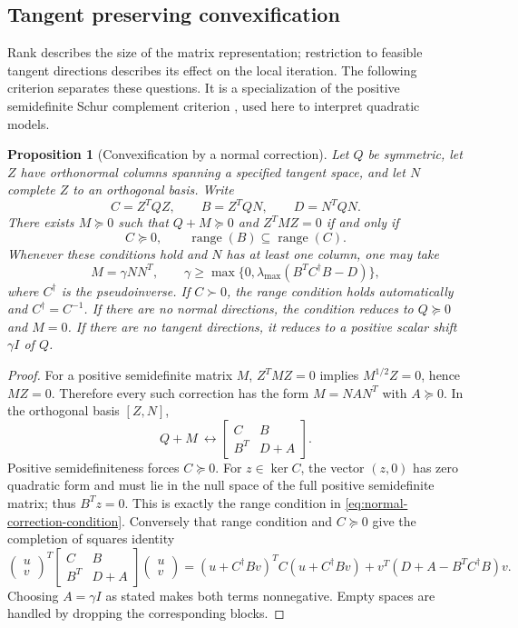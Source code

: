 \documentclass[pdflatex,sn-mathphys-num]{sn-jnl}
\theoremstyle{thmstyleone}
\newtheorem{proposition}[theorem]{Proposition}
\theoremstyle{thmstylethree}
\begin{document}
\subsection{Tangent preserving convexification}
\label{sec:normal-correction}
Rank describes the size of the matrix representation; restriction to
feasible tangent directions describes its effect on the local iteration.
The following criterion separates these questions. It is a specialization of the positive semidefinite
Schur complement criterion \citep{HornJohnson2013}, used here to interpret quadratic models.

\begin{proposition}[Convexification by a normal correction]
\label{prop:normal-correction}
Let $Q$ be symmetric, let $Z$ have orthonormal columns spanning a
specified tangent space, and let $N$ complete $Z$ to an orthogonal
basis. Write
\[
 C=Z^TQZ,\qquad B=Z^TQN,\qquad D=N^TQN.
\]
There exists $M\succeq0$ such that
$Q+M\succeq0$ and $Z^TMZ=0$ if and only if
\begin{equation}\label{eq:normal-correction-condition}
 C\succeq0,\qquad \operatorname{range}(B)
                         \subseteq\operatorname{range}(C).
\end{equation}
Whenever these conditions hold and $N$ has at least one column, one may take
\[
 M=\gamma NN^T,\qquad
 \gamma\geq\max\{0,\lambda_{\max}(B^TC^\dagger B-D)\},
\]
where $C^\dagger$ is the pseudoinverse. If $C\succ0$,
the range condition holds automatically and $C^\dagger=C^{-1}$.
If there are no normal directions, the condition reduces to
$Q\succeq0$ and $M=0$. If there are no tangent directions, it
reduces to a positive scalar shift $\gamma I$ of $Q$.
\end{proposition}
\begin{proof}
For a positive semidefinite matrix $M$, $Z^TMZ=0$ implies
$M^{1/2}Z=0$, hence $MZ=0$. Therefore every such correction has the
form $M=NAN^T$ with $A\succeq0$. In the orthogonal basis $[Z,N]$,
\[
 Q+M\ \longleftrightarrow
 \begin{bmatrix}C&B\\B^T&D+A\end{bmatrix}.
\]
Positive semidefiniteness forces $C\succeq0$. For
$z\in\ker C$, the vector $(z,0)$ has zero quadratic form and
must lie in the null space of the full positive semidefinite matrix;
thus $B^Tz=0$. This is exactly the range condition in
\eqref{eq:normal-correction-condition}.
Conversely that range condition and $C\succeq0$ give the
completion of squares identity
\[
 \begin{pmatrix}u\\v\end{pmatrix}^{\!T}
 \begin{bmatrix}C&B\\B^T&D+A\end{bmatrix}
 \begin{pmatrix}u\\v\end{pmatrix}
 =(u+C^\dagger Bv)^TC(u+C^\dagger Bv)
   +v^T(D+A-B^TC^\dagger B)v.
\]
Choosing $A=\gamma I$ as stated makes both terms nonnegative.
Empty spaces are handled by dropping the corresponding blocks.
\end{proof}
\end{document}
